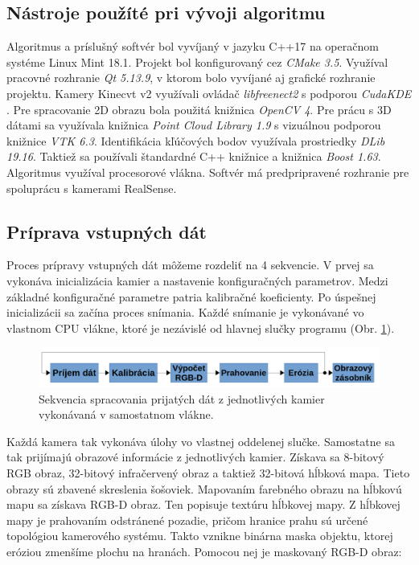 \subsection{Nástroje použíté pri vývoji algoritmu}

Algoritmus a príslušný softvér bol vyvíjaný v jazyku C++17 na operačnom systéme Linux Mint 18.1. Projekt bol konfigurovaný cez \textit{CMake 3.5}. Využíval pracovné rozhranie \textit{Qt 5.13.9}, v ktorom bolo vyvíjané aj grafické rozhranie projektu. Kamery Kinecvt v2 využívali ovládač \textit{libfreenect2} \cite{blake2015libfreenect2} s podporou \textit{CudaKDE} \cite{lawin2016efficient}. Pre spracovanie 2D obrazu bola použitá knižnica \textit{OpenCV 4}. Pre prácu s 3D dátami sa využívala knižnica \textit{Point Cloud Library 1.9} s vizuálnou podporou knižnice \textit{VTK 6.3}. Identifikácia kľúčových bodov využívala prostriedky \textit{DLib 19.16}. Taktiež sa používali štandardné C++ knižnice a knižnica \textit{Boost 1.63}. Algoritmus využíval procesorové vlákna. Softvér má predpripravené rozhranie pre spoluprácu s kamerami RealSense. 

\subsection{Príprava vstupných dát}
\label{sec:data_prep}
Proces prípravy vstupných dát môžeme rozdeliť na 4 sekvencie.
V prvej sa vykonáva inicializácia kamier a nastavenie konfiguračných parametrov. Medzi základné konfiguračné parametre patria kalibračné koeficienty. Po úspešnej inicializácii sa začína proces snímania. Každé snímanie je vykonávané vo vlastnom CPU vlákne, ktoré je nezávislé od hlavnej slučky programu (Obr. \ref{fig:scheme:c}).

\begin{figure}[H]
	\centering
	\includegraphics[width=\textwidth]{figures/diagram_cam.png}
	\caption{Sekvencia spracovania prijatých dát z jednotlivých kamier vykonávaná v samostatnom vlákne.}
	\label{fig:scheme:c}
\end{figure}

Každá kamera tak vykonáva úlohy vo vlastnej oddelenej slučke. Samostatne sa tak prijímajú obrazové informácie z jednotlivých kamier. Získava sa 8-bitový RGB obraz, 32-bitový infračervený obraz a taktiež 32-bitová hĺbková mapa. Tieto obrazy sú zbavené skreslenia šošoviek. Mapovaním farebného obrazu na hĺbkovú mapu sa získava RGB-D obraz. Ten popisuje textúru hĺbkovej mapy. Z hĺbkovej mapy je prahovaním odstránené pozadie, pričom hranice prahu sú určené topológiou kamerového systému. Takto vznikne binárna maska objektu, ktorej eróziou zmenšíme plochu na hranách. Pomocou nej je maskovaný RGB-D obraz: 

